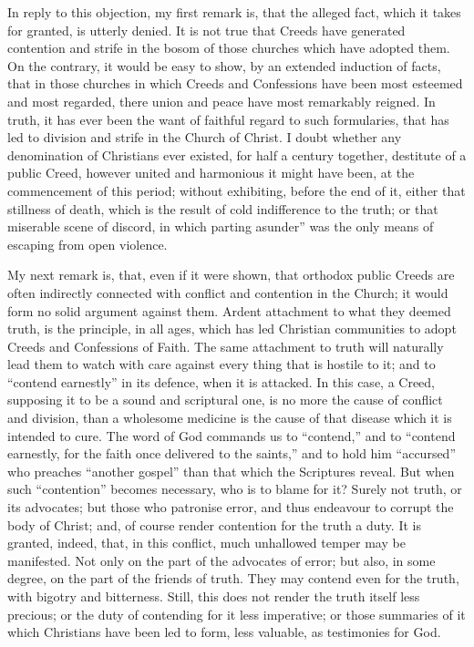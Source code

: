 \documentclass[
]{book}
\begin{document}
In reply to this objection, my first remark is, that the alleged fact, which it takes for granted, is utterly denied. It is not true that Creeds have generated contention and strife in the bosom of those churches which have adopted them. On the contrary, it would be easy to show, by an extended induction of facts, that in those churches in which Creeds and Confessions have been most esteemed and most regarded, there union and peace have most remarkably reigned. In truth, it has ever been the want of faithful regard to such formularies, that has led to division and strife in the Church of Christ. I doubt whether any denomination of Christians ever existed, for half a century together, destitute of a public Creed, however united and harmonious it might have been, at the commencement of this period; without exhibiting, before the end of it, either that stillness of death, which is the result of cold indifference to the truth; or that miserable scene of discord, in which parting asunder'' was the only means of escaping from open violence.

My next remark is, that, even if it were shown, that orthodox public Creeds are often indirectly connected with conflict and contention in the Church; it would form no solid argument against them. Ardent attachment to what they deemed truth, is the principle, in all ages, which has led Christian communities to adopt Creeds and Confessions of Faith. The same attachment to truth will naturally lead them to watch with care against every thing that is hostile to it; and to ``contend earnestly'' in its defence, when it is attacked. In this case, a Creed, supposing it to be a sound and scriptural one, is no more the cause of conflict and division, than a wholesome medicine is the cause of that disease which it is intended to cure. The word of God commands us to ``contend,'' and to ``contend earnestly, for the faith once delivered to the saints,'' and to hold him ``accursed'' who preaches ``another gospel'' than that which the Scriptures reveal. But when such ``contention'' becomes necessary, who is to blame for it? Surely not truth, or its advocates; but those who patronise error, and thus endeavour to corrupt the body of Christ; and, of course render contention for the truth a duty. It is granted, indeed, that, in this conflict, much unhallowed temper may be manifested. Not only on the part of the advocates of error; but also, in some degree, on the part of the friends of truth. They may contend even for the truth, with bigotry and bitterness. Still, this does not render the truth itself less precious; or the duty of contending for it less imperative; or those summaries of it which Christians have been led to form, less valuable, as testimonies for God.
\end{document}
